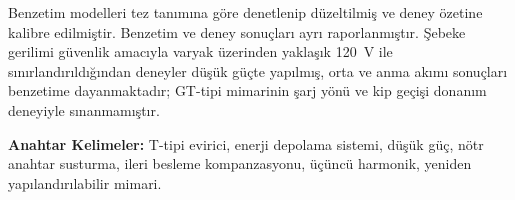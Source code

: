 Benzetim modelleri tez tanımına göre denetlenip düzeltilmiş ve deney özetine kalibre edilmiştir. Benzetim ve deney sonuçları ayrı raporlanmıştır. Şebeke gerilimi güvenlik amacıyla varyak üzerinden yaklaşık 120~V ile sınırlandırıldığından deneyler düşük güçte yapılmış, orta ve anma akımı sonuçları benzetime dayanmaktadır; GT-tipi mimarinin şarj yönü ve kip geçişi donanım deneyiyle sınanmamıştır.

\textbf{Anahtar Kelimeler:} T-tipi evirici, enerji depolama sistemi, düşük güç, nötr anahtar susturma, ileri besleme kompanzasyonu, üçüncü harmonik, yeniden yapılandırılabilir mimari.
\endgroup
